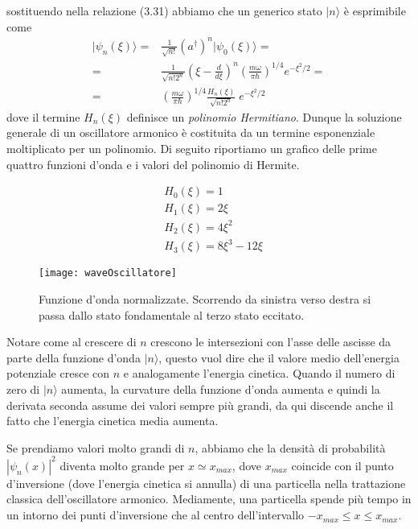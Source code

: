 \noindent sostituendo nella relazione (3.31) abbiamo che un generico stato $|n \rangle$ \`e esprimibile come
\begin{align*}
	|\psi_n(\xi)\rangle = & \frac{1}{\sqrt{n!}} (a^\dag)^n|\psi_0(\xi) \rangle = \\[0.5cm]
	=& \frac{1}{\sqrt{n!2^n}} \left( \xi - \frac{d}{d\xi} \right )^n \left ( \frac{m\omega}{\pi \hbar} \right)^{1/4} e^{-\xi^2/2} = \\[0.5cm]
	= & \left ( \frac{m\omega}{\pi \hbar} \right)^{1/4}\frac{H_n(\xi)}{\sqrt{n!2^n}} \; e^{-\xi^2/2}
\end{align*}
dove il termine $H_n(\xi)$ definisce un \textit{polinomio Hermitiano}. Dunque la soluzione generale di un oscillatore armonico \`e costituita da un termine esponenziale moltiplicato per un polinomio. Di seguito riportiamo un grafico delle prime quattro funzioni d'onda e i valori del polinomio di Hermite.

\begin{align*}
	&H_0(\xi) = 1\\[0.2cm]
	&H_1(\xi) = 2 \xi\\[0.2cm]
	&H_2(\xi) = 4\xi^2\\[0.2cm]
	&H_3(\xi) = 8\xi^3 - 12\xi
\end{align*}

 
\begin{figure}[!ht]
\vspace{0.1in}
\texttt{[image: waveOscillatore]}	
\centering
\vspace{0.1in}
\caption{Funzione d'onda normalizzate. Scorrendo da sinistra verso destra si passa dallo stato fondamentale al terzo stato eccitato.}
\end{figure}

Notare come al crescere di $n$ crescono le intersezioni con l'asse delle ascisse da parte della funzione d'onda  $|n \rangle $, questo vuol dire che il valore medio dell'energia potenziale cresce con $n$ e analogamente l'energia cinetica.
\newpage
Quando il numero di zero di $|n \rangle$ aumenta, la curvature della funzione d'onda aumenta e quindi la derivata seconda assume dei valori sempre pi\`u grandi, da qui discende anche il fatto che l'energia  cinetica media aumenta. 

Se prendiamo valori molto grandi di $n$, abbiamo che la densit\`a di probabilit\`a $|\psi_n(x)|^2$ diventa molto grande per $x \simeq x_{max}$, dove $x_{max}$ coincide con il punto d'inversione (dove l'energia cinetica si annulla) di una particella nella trattazione classica dell'oscillatore armonico. Mediamente, una particella spende pi\`u tempo in un intorno dei punti d'inversione che al centro dell'intervallo $-x_{max} \leq x \leq x_{max}$.

